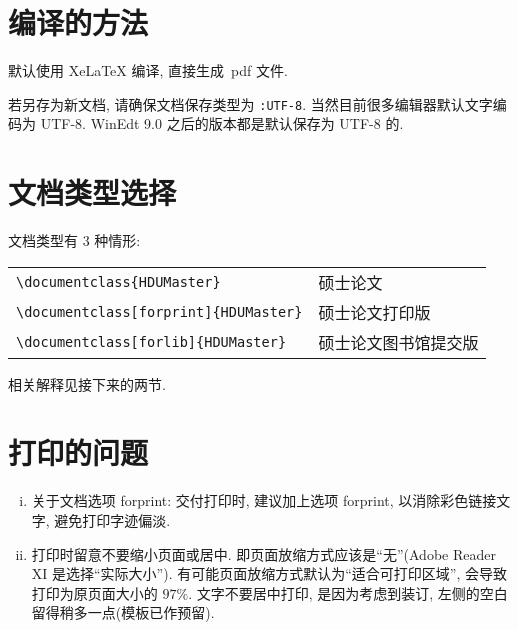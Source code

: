 \documentclass[forlib]{HDUMaster}   %
\begin{document}
\section{编译的方法}\label{sec-compile}

默认使用 XeLaTeX 编译, 直接生成~pdf 文件.

若另存为新文档, 请确保文档保存类型为 \verb|:UTF-8|. 当然目前很多编辑器默认文字编码为 UTF-8.
WinEdt 9.0 之后的版本都是默认保存为 UTF-8 的.



\section{文档类型选择}
文档类型有 3 种情形:

\begin{table}[ht]\centering
\begin{tabular}{ll}
\hline
   \verb|\documentclass{HDUMaster}|                 &  硕士论文 \\
   \verb|\documentclass[forprint]{HDUMaster}|    &  硕士论文打印版  \\
   \verb|\documentclass[forlib]{HDUMaster}|       &  硕士论文图书馆提交版  \\
\hline
\end{tabular}
\end{table}




相关解释见接下来的两节.



\section{打印的问题}
\begin{enumerate}[i)]
  \item  关于文档选项 forprint: 交付打印时, 建议加上选项 forprint, 以消除彩色链接文字, 避免打印字迹偏淡.
  \item  打印时留意不要缩小页面或居中. 即页面放缩方式应该是``无''(Adobe Reader XI 是选择``实际大小'').
           有可能页面放缩方式默认为``适合可打印区域'', 会导致打印为原页面大小的 $97\%$.
           文字不要居中打印, 是因为考虑到装订, 左侧的空白留得稍多一点(模板已作预留).
\end{enumerate}
\end{document}
